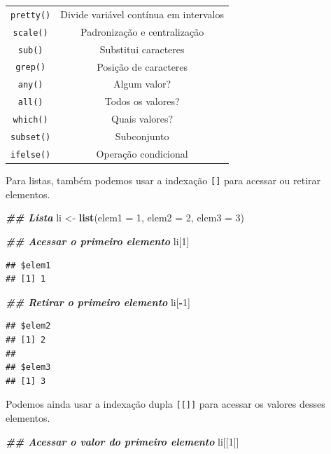 \documentclass[
]{article}
\newenvironment{Shaded}{\begin{snugshade}}{\end{snugshade}}
\newcommand{\AttributeTok}[1]{\textcolor[rgb]{0.13,0.29,0.53}{#1}}
\newcommand{\DecValTok}[1]{\textcolor[rgb]{0.00,0.00,0.81}{#1}}
\newcommand{\DocumentationTok}[1]{\textcolor[rgb]{0.56,0.35,0.01}{\textbf{\textit{#1}}}}
\newcommand{\FunctionTok}[1]{\textcolor[rgb]{0.13,0.29,0.53}{\textbf{#1}}}
\newcommand{\NormalTok}[1]{#1}
\newcommand{\OtherTok}[1]{\textcolor[rgb]{0.56,0.35,0.01}{#1}}
\newcommand{\SpecialCharTok}[1]{\textcolor[rgb]{0.81,0.36,0.00}{\textbf{#1}}}
\begin{document}
\begin{longtable}[]{@{}cc@{}}
\texttt{pretty()} & Divide variável contínua em intervalos \\
\texttt{scale()} & Padronização e centralização \\
\texttt{sub()} & Substitui caracteres \\
\texttt{grep()} & Posição de caracteres \\
\texttt{any()} & Algum valor? \\
\texttt{all()} & Todos os valores? \\
\texttt{which()} & Quais valores? \\
\texttt{subset()} & Subconjunto \\
\texttt{ifelse()} & Operação condicional \\
\end{longtable}

Para listas, também podemos usar a indexação \texttt{{[}{]}} para acessar ou retirar elementos.

\begin{Shaded}
\begin{Highlighting}[]
\DocumentationTok{\#\# Lista}
\NormalTok{li }\OtherTok{\textless{}{-}} \FunctionTok{list}\NormalTok{(}\AttributeTok{elem1 =} \DecValTok{1}\NormalTok{, }\AttributeTok{elem2 =} \DecValTok{2}\NormalTok{, }\AttributeTok{elem3 =} \DecValTok{3}\NormalTok{)}

\DocumentationTok{\#\# Acessar o primeiro elemento}
\NormalTok{li[}\DecValTok{1}\NormalTok{]}
\end{Highlighting}
\end{Shaded}

\begin{verbatim}
## $elem1
## [1] 1
\end{verbatim}

\begin{Shaded}
\begin{Highlighting}[]
\DocumentationTok{\#\# Retirar o primeiro elemento}
\NormalTok{li[}\SpecialCharTok{{-}}\DecValTok{1}\NormalTok{]}
\end{Highlighting}
\end{Shaded}

\begin{verbatim}
## $elem2
## [1] 2
## 
## $elem3
## [1] 3
\end{verbatim}

Podemos ainda usar a indexação dupla \texttt{{[}{[}{]}{]}} para acessar os valores desses elementos.

\begin{Shaded}
\begin{Highlighting}[]
\DocumentationTok{\#\# Acessar o valor do primeiro elemento}
\NormalTok{li[[}\DecValTok{1}\NormalTok{]]}
\end{Highlighting}
\end{Shaded}
\end{document}
